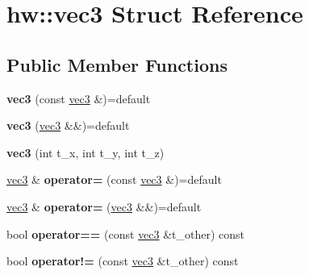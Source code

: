 \hypertarget{structhw_1_1vec3}{}\section{hw\+:\+:vec3 Struct Reference}
\label{structhw_1_1vec3}
\subsection*{Public Member Functions}
\begin{DoxyCompactItemize}
\item 
\mbox{\label{structhw_1_1vec3_a792298bfe989b861e27283b9b8744a41}} 
{\bfseries vec3} (const \mbox{\hyperlink{structhw_1_1vec3}{vec3}} \&)=default
\item 
\mbox{\label{structhw_1_1vec3_a4e5e8febadfcba10c22ad140ece64a47}} 
{\bfseries vec3} (\mbox{\hyperlink{structhw_1_1vec3}{vec3}} \&\&)=default
\item 
\mbox{\label{structhw_1_1vec3_ab034aa709ee75340b95571e15dbc491e}} 
{\bfseries vec3} (int t\+\_\+x, int t\+\_\+y, int t\+\_\+z)
\item 
\mbox{\label{structhw_1_1vec3_a6cd2ab41fa7799075f0f1a22e6b1b662}} 
\mbox{\hyperlink{structhw_1_1vec3}{vec3}} \& {\bfseries operator=} (const \mbox{\hyperlink{structhw_1_1vec3}{vec3}} \&)=default
\item 
\mbox{\label{structhw_1_1vec3_ae6b9b26a5c5aac5e9dd34e16974b62b7}} 
\mbox{\hyperlink{structhw_1_1vec3}{vec3}} \& {\bfseries operator=} (\mbox{\hyperlink{structhw_1_1vec3}{vec3}} \&\&)=default
\item 
\mbox{\label{structhw_1_1vec3_aba500e25ec9e390ee5813861c434161a}} 
bool {\bfseries operator==} (const \mbox{\hyperlink{structhw_1_1vec3}{vec3}} \&t\+\_\+other) const
\item 
\mbox{\label{structhw_1_1vec3_abfd46c9091bc3a16420696c349826131}} 
bool {\bfseries operator!=} (const \mbox{\hyperlink{structhw_1_1vec3}{vec3}} \&t\+\_\+other) const
\item 
\mbox{\label{structhw_1_1vec3_a165da4b0160df52578641e7e6cbc9d93}} 

\end{DoxyCompactItemize}

